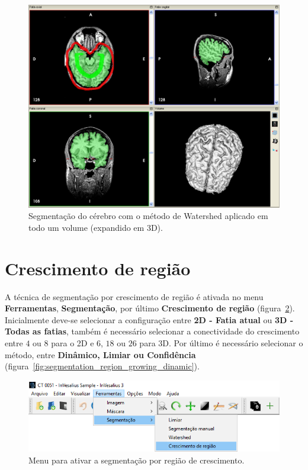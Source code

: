 \begin{figure}[!htb]
\centering
\includegraphics[scale=0.4]{../user_guide_figures/invesalius_screen/segmentation_watershed_multiplanar_3d_pt.png}
\caption{Segmentação do cérebro com o método de Watershed aplicado em todo um volume (expandido em 3D).}
\label{fig:watershed_3d}
\end{figure}

\section{Crescimento de região}

A técnica de segmentação por crescimento de região é ativada no menu \textbf{Ferramentas}, \textbf{Segmentação}, por último \textbf{Crescimento de região} (figura~\ref{fig:menu_segmentation_region_growing}). Inicialmente deve-se selecionar a configuração entre \textbf{2D - Fatia atual} ou \textbf{3D - Todas as fatias}, também é necessário selecionar a conectividade do crescimento entre $4$ ou $8$ para o 2D e $6$, $18$ ou $26$ para 3D. Por último é necessário selecionar o método, entre \textbf{Dinâmico, Limiar ou Confidência} (figura~\ref{fig:segmentation_region_growing_dinamic}).

\begin{figure}[!htb]
\centering
\includegraphics[scale=0.5]{../user_guide_figures/invesalius_screen/menu_segmentation_region_growing_pt.png}
\caption{Menu para ativar a segmentação por região de crescimento.}
\label{fig:menu_segmentation_region_growing}
\end{figure}

